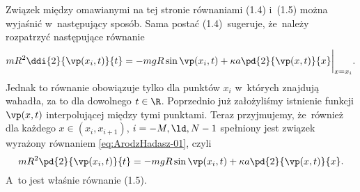 \documentclass[a4paper,11pt]{article}
\begin{document}
\newpage
{}

\vspace{\spaceTwo} %






\start {} Związek między omawianymi na tej stronie równaniami (1.4) i~(1.5) można wyjaśnić w~następujący sposób. Sama postać (1.4)~sugeruje, że~należy rozpatrzyć następujące równanie
\begin{equation}
  \label{eq:ArodzHadasz-01}
  mR^{ 2 } \ddi{ 2 }{ \vp( x_{ i }, t ) }{ t }
  = -mgR \sin\vp( x_{ i }, t )
  + \kappa a \pd{ 2 }{ \vp( x, t ) }{ x }\bigg|_{ x = x_{ i } }.
\end{equation}
Jednak to równanie obowiązuje tylko dla punktów $x_{ i }$ w~których znajdują wahadła, za to dla dowolnego $t \in \R$. Poprzednio już założyliśmy istnienie funkcji $\vp( x , t )$ interpolującej między tymi punktami. Teraz przyjmujemy, że~również dla każdego $x \in ( x_{ i }, x_{ i + 1 } )$, $i = -M,\ld, N - 1$ spełniony jest związek wyrażony równaniem \eqref{eq:ArodzHadasz-01}, czyli
\begin{equation}
  \label{eq:ArodzHadasz-02}
    mR^{ 2 } \pd{ 2 }{ \vp( x_{ i }, t ) }{ t }
  = -mgR \sin\vp( x_{ i }, t ) + \kappa a \pd{ 2 }{ \vp( x, t ) }{ x }.
\end{equation}
A~to jest właśnie równanie (1.5).

\end{document}
